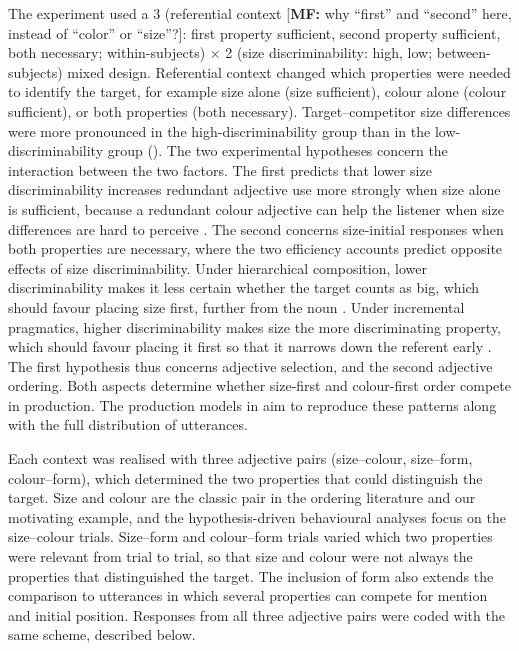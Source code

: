 \documentclass[10pt,a4paper,fleqn]{article}
\newcommand{\mf}[1]{\textcolor{shimmer-main}{[\textbf{MF: }{#1}]}}
\begin{document}
The experiment used a 3 (referential context \mf{why ``first'' and ``second'' here, instead of ``color'' or ``size''?}: first property sufficient, second property sufficient, both necessary; within-subjects) $\times$ 2 (size discriminability: high, low; between-subjects) mixed design.
Referential context changed which properties were needed to identify the target, for example size alone (size sufficient), colour alone (colour sufficient), or both properties (both necessary).
Target--competitor size differences were more pronounced in the high-discriminability group than in the low-discriminability group ().
The two experimental hypotheses concern the interaction between the two factors.
The first predicts that lower size discriminability increases redundant adjective use more strongly when size alone is sufficient, because a redundant colour adjective can help the listener when size differences are hard to perceive \citep{rubio2016redundant,degen2020redundancy}.
The second concerns size-initial responses when both properties are necessary, where the two efficiency accounts predict opposite effects of size discriminability.
Under hierarchical composition, lower discriminability makes it less certain whether the target counts as big, which should favour placing size first, further from the noun \citep{scontras2017subjectivity,franke2019subjectivity}.
Under incremental pragmatics, higher discriminability makes size the more discriminating property, which should favour placing it first so that it narrows down the referent early \citep{fukumura2018ordering,rubio2021wordorder}.
The first hypothesis thus concerns adjective selection, and the second adjective ordering.
Both aspects determine whether size-first and colour-first order compete in production.
The production models in  aim to reproduce these patterns along with the full distribution of utterances.

Each context was realised with three adjective pairs (size--colour, size--form, colour--form), which determined the two properties that could distinguish the target.
Size and colour are the classic pair in the ordering literature and our motivating example, and the hypothesis-driven behavioural analyses focus on the size--colour trials.
Size--form and colour--form trials varied which two properties were relevant from trial to trial, so that size and colour were not always the properties that distinguished the target.
The inclusion of form also extends the comparison to utterances in which several properties can compete for mention and initial position.
Responses from all three adjective pairs were coded with the same scheme, described below.
\end{document}
